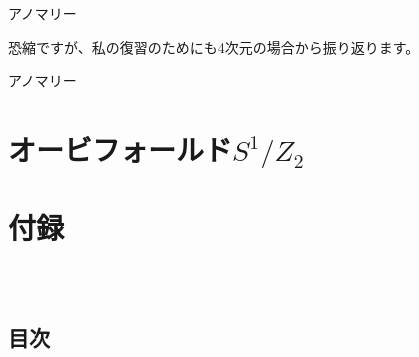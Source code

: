 \documentclass[
  unicode,a4paper,10pt,
  xcolor = {dvipsnames,svgnames},
  hyperref ={colorlinks=true,citecolor=Navy,linkcolor=NavyBlue,urlcolor=purple},
  ja=standard,lualatex
]{beamer}
\begin{document}
\begin{frame}{アノマリー}

  恐縮ですが、私の復習のためにも4次元の場合から振り返ります。

  \vspace*{5pt}

  \pause

  

\end{frame}



\begin{frame}{アノマリー}


  

\end{frame}



\section{オービフォールド\texorpdfstring{$S^{1}/Z_{2}$}{S1/Z2}}

\begin{frame}
  \huge \secname
\end{frame}


\begin{frame}

  

\end{frame}




\setcounter{Appendix}{\value{framenumber}}
\setcounter{section}{0}
\renewcommand{\thesubsection}{\Alph{subsection}}
\makeatletter
\renewcommand{\theequation}{\thesubsection.\arabic{equation}}

\renewcommand{\thefigure}{\thesubsection.\arabic{figure}}

\renewcommand{\thetable}{\thesubsection.\arabic{table}}
\makeatother

\section{付録}

\begin{frame}[plain]
  \frametitle{\ }
  \huge \secname
\end{frame}

\subsection{目次}
\end{document}
